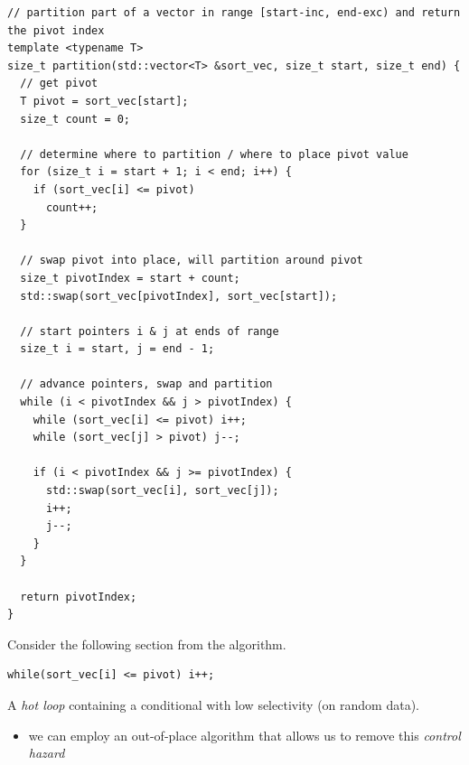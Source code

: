 \begin{verbatim}
// partition part of a vector in range [start-inc, end-exc) and return the pivot index
template <typename T>
size_t partition(std::vector<T> &sort_vec, size_t start, size_t end) {
  // get pivot
  T pivot = sort_vec[start];
  size_t count = 0;

  // determine where to partition / where to place pivot value
  for (size_t i = start + 1; i < end; i++) {
    if (sort_vec[i] <= pivot)
      count++;
  }
  
  // swap pivot into place, will partition around pivot
  size_t pivotIndex = start + count;
  std::swap(sort_vec[pivotIndex], sort_vec[start]);
  
  // start pointers i & j at ends of range
  size_t i = start, j = end - 1;
  
  // advance pointers, swap and partition
  while (i < pivotIndex && j > pivotIndex) {
    while (sort_vec[i] <= pivot) i++;
    while (sort_vec[j] > pivot) j--;

    if (i < pivotIndex && j >= pivotIndex) {
      std::swap(sort_vec[i], sort_vec[j]);
      i++;
      j--;
    }
  }

  return pivotIndex;
}
\end{verbatim}

Consider the following section from the algorithm.
\begin{verbatim}
while(sort_vec[i] <= pivot) i++;
\end{verbatim}
A \textit{hot loop} containing a conditional with low selectivity (on random data).
\begin{itemize}
    \item we can employ an out-of-place algorithm that allows us to remove this \textit{control hazard}
\end{itemize}

